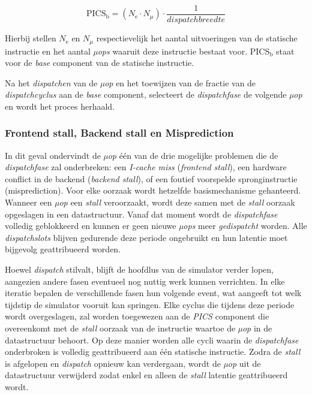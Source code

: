 \documentclass[12pt,a4paper,faculty=ea,language=nl]{ugent-doc}
\begin{document}
\begin{equation}
    \text{PICS}_{\text{b}} = (N_{\text{e}} \cdot N_{\mu}) \cdot \frac{1}{dispatchbreedte}
    \label{eq:pics_base}
\end{equation}

Hierbij stellen $N_{\text{e}}$ en $N_{\mu}$ respectievelijk het aantal uitvoeringen
van de statische instructie en het aantal \textit{µops} waaruit deze instructie
bestaat voor. $\text{PICS}_{\text{b}}$ staat voor de \textit{base} component van de statische instructie.


Na het \textit{dispatchen} van de \textit{µop} en het toewijzen van de fractie van de \textit{dispatchcyclus} aan de \textit{base} component, selecteert de \textit{dispatchfase} de volgende \textit{µop} en wordt het proces herhaald.

\subsubsection{Frontend stall, Backend stall en Misprediction}
\label{paragraph:basismechanisme PICS}
In dit geval ondervindt de \textit{µop} één van de drie mogelijke problemen die de \textit{dispatchfase} zal onderbreken: een \textit{I-cache miss} (\textit{frontend stall}), een hardware conflict in de backend (\textit{backend stall}), of een foutief voorspelde spronginstructie (misprediction).
Voor elke oorzaak wordt hetzelfde basismechanisme gehanteerd. Wanneer een \textit{µop} een \textit{stall} veroorzaakt, wordt deze samen met de \textit{stall} oorzaak opgeslagen in een datastructuur. Vanaf dat moment wordt de \textit{dispatchfase} volledig geblokkeerd en kunnen er geen nieuwe \textit{µops} meer \textit{gedispatcht} worden.
Alle \textit{dispatchslots} blijven gedurende deze periode ongebruikt en hun latentie moet bijgevolg geattribueerd worden.

Hoewel \textit{dispatch} stilvalt, blijft de hoofdlus van de simulator verder lopen, aangezien andere fasen eventueel nog nuttig werk kunnen verrichten. In elke iteratie bepalen de verschillende fasen hun volgende event,
wat aangeeft tot welk tijdstip de simulator vooruit kan springen. Elke cyclus die tijdens deze periode wordt overgeslagen, zal worden toegewezen aan de \textit{PICS} component die overeenkomt met de \textit{stall} oorzaak van de instructie waartoe de \textit{µop} in de datastructuur behoort.
Op deze manier worden alle cycli waarin de \textit{dispatchfase} onderbroken is volledig geattribueerd aan één statische instructie. Zodra de \textit{stall} is afgelopen en \textit{dispatch} opnieuw kan verdergaan, wordt de \textit{µop} uit de datastructuur verwijderd zodat enkel en alleen de \textit{stall} latentie geattribueerd wordt.
\end{document}
